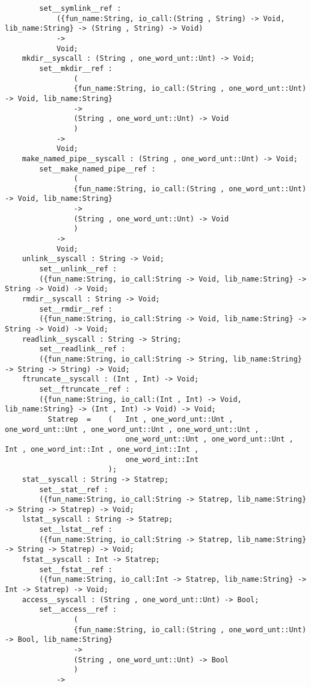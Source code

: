 \begin{verbatim}
        set__symlink__ref :
            ({fun_name:String, io_call:(String , String) -> Void, lib_name:String} -> (String , String) -> Void)
            ->
            Void;
    mkdir__syscall : (String , one_word_unt::Unt) -> Void;
        set__mkdir__ref :
                (
                {fun_name:String, io_call:(String , one_word_unt::Unt) -> Void, lib_name:String}
                ->
                (String , one_word_unt::Unt) -> Void
                )
            ->
            Void;
    make_named_pipe__syscall : (String , one_word_unt::Unt) -> Void;
        set__make_named_pipe__ref :
                (
                {fun_name:String, io_call:(String , one_word_unt::Unt) -> Void, lib_name:String}
                ->
                (String , one_word_unt::Unt) -> Void
                )
            ->
            Void;
    unlink__syscall : String -> Void;
        set__unlink__ref :
        ({fun_name:String, io_call:String -> Void, lib_name:String} -> String -> Void) -> Void;
    rmdir__syscall : String -> Void;
        set__rmdir__ref :
        ({fun_name:String, io_call:String -> Void, lib_name:String} -> String -> Void) -> Void;
    readlink__syscall : String -> String;
        set__readlink__ref :
        ({fun_name:String, io_call:String -> String, lib_name:String} -> String -> String) -> Void;
    ftruncate__syscall : (Int , Int) -> Void;
        set__ftruncate__ref :
        ({fun_name:String, io_call:(Int , Int) -> Void, lib_name:String} -> (Int , Int) -> Void) -> Void;
          Statrep  =    (   Int , one_word_unt::Unt , one_word_unt::Unt , one_word_unt::Unt , one_word_unt::Unt ,
                            one_word_unt::Unt , one_word_unt::Unt , Int , one_word_int::Int , one_word_int::Int ,
                            one_word_int::Int
                        );
    stat__syscall : String -> Statrep;
        set__stat__ref :
        ({fun_name:String, io_call:String -> Statrep, lib_name:String} -> String -> Statrep) -> Void;
    lstat__syscall : String -> Statrep;
        set__lstat__ref :
        ({fun_name:String, io_call:String -> Statrep, lib_name:String} -> String -> Statrep) -> Void;
    fstat__syscall : Int -> Statrep;
        set__fstat__ref :
        ({fun_name:String, io_call:Int -> Statrep, lib_name:String} -> Int -> Statrep) -> Void;
    access__syscall : (String , one_word_unt::Unt) -> Bool;
        set__access__ref :
                (
                {fun_name:String, io_call:(String , one_word_unt::Unt) -> Bool, lib_name:String}
                ->
                (String , one_word_unt::Unt) -> Bool
                )
            ->

\end{verbatim}
